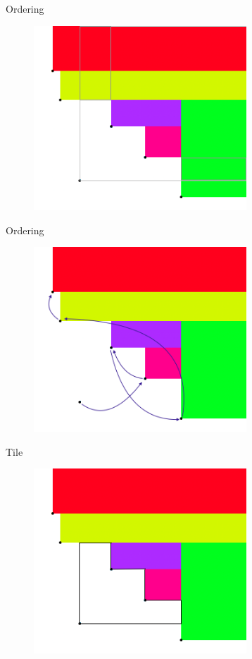 \documentclass[11pt, british]{beamer}
\begin{document}
\begin{frame}{Ordering}
  \begin{figure}
    \centering
    \includegraphics[width=8cm]{precedence 1.png}
  \end{figure}
\end{frame}

\begin{frame}{Ordering}
  \begin{figure}
    \centering
    \includegraphics[width=8cm]{precedence 2.png}
  \end{figure}
\end{frame}

\begin{frame}{Tile}
  \begin{figure}
    \centering
    \includegraphics[width=8cm]{tile.png}
  \end{figure}
\end{frame}
\end{document}
